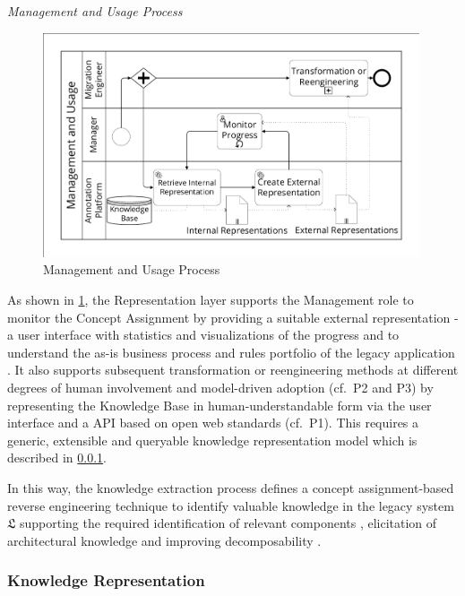 \emph{Management and Usage Process}

\begin{figure}
\hypertarget{fig:awsm.re.usage}{%
\centering
\includegraphics[width=0.99\textwidth]{../figures/awsm-re-usage.pdf}
\caption{Management and Usage Process}\label{fig:awsm.re.usage}
}
\end{figure}

As shown in \cref{fig:awsm.re.usage}, the Representation layer supports the Management role to monitor the Concept Assignment by providing a suitable external representation - a user interface with statistics and visualizations of the progress and to understand the as-is business process and rules portfolio of the legacy application \autocite{Razavian2010SAPIENSA}.
It also supports subsequent transformation or reengineering methods at different degrees of human involvement and model-driven adoption (cf.~P2 and P3) by representing the Knowledge Base in human-understandable form via the user interface and a API based on open web standards (cf.~P1).
This requires a generic, extensible and queryable knowledge representation model which is described in \cref{sec:representation}.

In this way, the knowledge extraction process defines a concept assignment-based reverse engineering technique to identify valuable knowledge \autocite{Gold2005ConceptSlicing} in the legacy system \(\mathfrak L\) supporting the required identification of relevant components \autocite{Lewis2008SMART}, elicitation of architectural knowledge \autocite{Razavian2010SAPIENSA} and improving decomposability \autocite{Canfora2000Decomposing}.

\hypertarget{sec:representation}{%
\subsubsection{Knowledge Representation}\label{sec:representation}}

